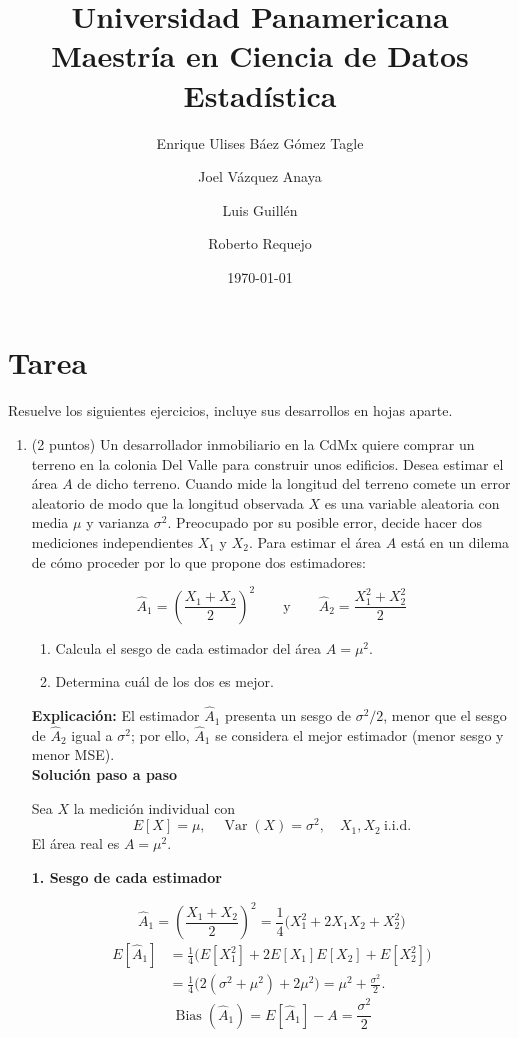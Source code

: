 \documentclass[12pt]{article}
\title{Universidad Panamericana \\ Maestría en Ciencia de Datos \\ Estadística}
\date{\today}
\author{Enrique Ulises Báez Gómez Tagle \and Joel Vázquez Anaya \and Luis Guillén \and Roberto Requejo}
\begin{document}
\maketitle

\section*{Tarea}

Resuelve los siguientes ejercicios, incluye sus desarrollos en hojas aparte.

\begin{enumerate}
	\item (2 puntos) Un desarrollador inmobiliario en la CdMx quiere comprar un terreno en la colonia Del Valle para construir unos edificios. Desea estimar el área $A$ de dicho terreno. Cuando mide la longitud del terreno comete un error aleatorio de modo que la longitud observada $X$ es una variable aleatoria con media $\mu$ y varianza $\sigma^2$. Preocupado por su posible error, decide hacer dos mediciones independientes $X_1$ y $X_2$. Para estimar el área $A$ está en un dilema de cómo proceder por lo que propone dos estimadores:

	      \[
		      \hat{A}_1 = \left( \frac{X_1 + X_2}{2} \right)^2 \qquad \text{y} \qquad \hat{A}_2 = \frac{X_1^2 + X_2^2}{2}
	      \]

	      \begin{enumerate}
		      \item Calcula el sesgo de cada estimador del área $A = \mu^2$.
		      \item Determina cuál de los dos es mejor.
	      \end{enumerate}
	      \begingroup\color{blue}
	      \textbf{Explicación:} El estimador \(\hat{A}_1\) presenta un sesgo de \(\sigma^2/2\), menor que el sesgo de \(\hat{A}_2\) igual a \(\sigma^2\); por ello, \(\hat{A}_1\) se considera el mejor estimador (menor sesgo y menor MSE).
	      \\[1em]
	      \textbf{Solución paso a paso}

	      Sea \(X\) la medición individual con
	      \[
		      E[X]=\mu,\quad \operatorname{Var}(X)=\sigma^{2},\quad X_1,X_2\ \text{i.i.d.}
	      \]
	      El área real es \(A=\mu^{2}\).

	      \medskip
	      \textbf{1. Sesgo de cada estimador}

	      \[
		      \hat A_{1}= \left(\frac{X_{1}+X_{2}}{2}\right)^{2}
		      = \frac{1}{4}\bigl(X_{1}^{2}+2X_{1}X_{2}+X_{2}^{2}\bigr)
	      \]
	      \begin{align*}
		      E[\hat A_{1}]
		       & =\frac{1}{4}\bigl(E[X_{1}^{2}]+2E[X_{1}]E[X_{2}]+E[X_{2}^{2}]\bigr) \\
		       & =\frac{1}{4}\bigl(2(\sigma^{2}+\mu^{2})+2\mu^{2}\bigr)
		      =\mu^{2}+\frac{\sigma^{2}}{2}.
	      \end{align*}
	      \[
		      \boxed{\operatorname{Bias}(\hat A_{1})=E[\hat A_{1}]-A=\frac{\sigma^{2}}{2}}
	      \]


\end{enumerate}
\end{document}

